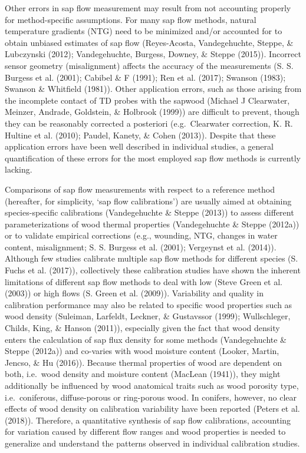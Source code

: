 \documentclass[11pt,twoside]{reedthesis}
\begin{document}
Other errors in sap flow measurement may result from not accounting
properly for method-specific assumptions. For many sap flow methods,
natural temperature gradients (NTG) need to be minimized and/or
accounted for to obtain unbiased estimates of sap flow (Reyes-Acosta,
Vandegehuchte, Steppe, \& Lubczynski (2012); Vandegehuchte, Burgess,
Downey, \& Steppe (2015)). Incorrect sensor geometry (misalignment)
affects the accuracy of the measurements (S. S. Burgess et al. (2001);
Cabibel \& F (1991); Ren et al. (2017); Swanson (1983); Swanson \&
Whitfield (1981)). Other application errors, such as those arising from
the incomplete contact of TD probes with the sapwood (Michael J
Clearwater, Meinzer, Andrade, Goldstein, \& Holbrook (1999)) are
difficult to prevent, though they can be reasonably corrected a
posteriori (e.g.~Clearwater correction, K. R. Hultine et al. (2010);
Paudel, Kanety, \& Cohen (2013)). Despite that these application errors
have been well described in individual studies, a general quantification
of these errors for the most employed sap flow methods is currently
lacking.\par

Comparisons of sap flow measurements with respect to a reference method
(hereafter, for simplicity, `sap flow calibrations') are usually aimed
at obtaining species-specific calibrations (Vandegehuchte \& Steppe
(2013)) to assess different parameterizations of wood thermal properties
(Vandegehuchte \& Steppe (2012a)) or to validate empirical corrections
(e.g., wounding, NTG, changes in water content, misalignment; S. S.
Burgess et al. (2001); Vergeynst et al. (2014)). Although few studies
calibrate multiple sap flow methods for different species (S. Fuchs et
al. (2017)), collectively these calibration studies have shown the
inherent limitations of different sap flow methods to deal with low
(Steve Green et al. (2003)) or high flows (S. Green et al. (2009)).
Variability and quality in calibration performance may also be related
to specific wood properties such as wood density (Suleiman, Larfeldt,
Leckner, \& Gustavssor (1999); Wullschleger, Childs, King, \& Hanson
(2011)), especially given the fact that wood density enters the
calculation of sap flux density for some methods (Vandegehuchte \&
Steppe (2012a)) and co-varies with wood moisture content (Looker,
Martin, Jencso, \& Hu (2016)). Because thermal properties of wood are
dependent on both, i.e.~wood density and moisture content (MacLean
(1941)), they might additionally be influenced by wood anatomical traits
such as wood porosity type, i.e.~coniferous, diffuse-porous or
ring-porous wood. In conifers, however, no clear effects of wood density
on calibration variability have been reported (Peters et al. (2018)).
Therefore, a quantitative synthesis of sap flow calibrations, accounting
for variation caused by different flow ranges and wood properties is
needed to generalize and understand the patterns observed in individual
calibration studies.\par
\end{document}
